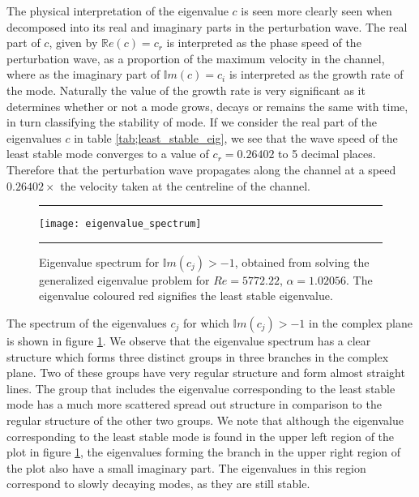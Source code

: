 \documentclass[a4paper, 12pt, twoside, openright]{article}
\numberwithin{equation}{section}
\begin{document}
The physical interpretation of the eigenvalue $c$ is seen more clearly seen when decomposed into its real and imaginary parts in the perturbation wave. The real part of $c$, given by $\mathbb{R}e\left(c\right)=c_r$ is interpreted as the phase speed of the perturbation wave, as a proportion of the maximum velocity in the channel, where as the imaginary part of $\mathbb{I}m\left(c\right)=c_i$ is interpreted as the growth rate of the mode. Naturally the value of the growth rate is very significant as it determines whether or not a mode grows, decays or remains the same with time, in turn classifying the stability of mode. If we consider the real part of the eigenvalues $c$ in table \ref{tab;least_stable_eig}, we see that the wave speed of the least stable mode converges to a value of $c_r = 0.26402$ to 5 decimal places. Therefore that the perturbation wave propagates along the channel at a speed $0.26402 \times$ the velocity taken at the centreline of the channel. %
\begin{figure}[H]
\centering
\rule{\linewidth}{1.5pt}
\texttt{[image: eigenvalue\_spectrum]}
\caption{Eigenvalue spectrum for $\mathbb{I}m\left(c_j\right)>-1$, obtained from solving the generalized eigenvalue problem for $Re=5772.22$, $\alpha=1.02056$. The eigenvalue coloured red signifies the least stable eigenvalue.}
\label{eigenvalue_spectrum}
\rule{\linewidth}{1.5pt}
\end{figure}

The spectrum of the eigenvalues $c_j$ for which $\mathbb{I}m\left(c_j\right)>-1$ in the complex plane is shown in figure \ref{eigenvalue_spectrum}. We observe that the eigenvalue spectrum has a clear structure which forms three distinct groups in three branches in the complex plane. Two of these groups have very regular structure and form almost straight lines. The group that includes the eigenvalue corresponding to the least stable mode has a much more scattered spread out structure in comparison to the regular structure of the other two groups. We note that although the eigenvalue corresponding to the least stable mode is found in the upper left region of the plot in figure \ref{eigenvalue_spectrum}, the eigenvalues forming the branch in the upper right region of the plot also have a small imaginary part. The eigenvalues in this region correspond to slowly decaying modes, as they are still stable. %
\end{document}
